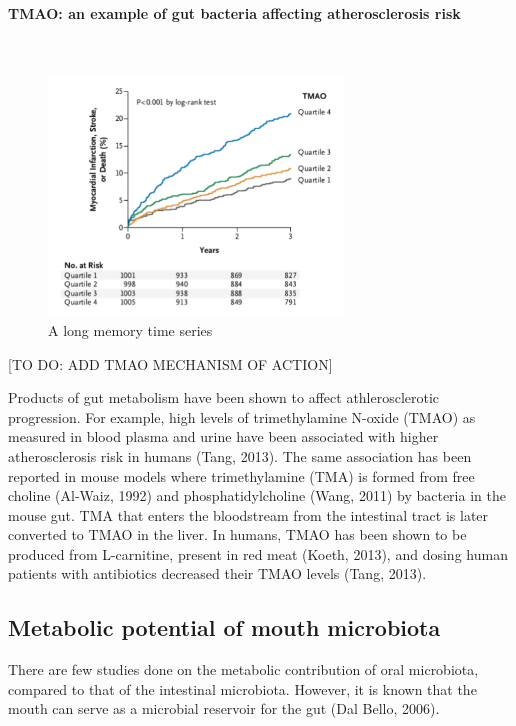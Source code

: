 \paragraph{TMAO: an example of gut bacteria affecting atherosclerosis risk}\mbox{}\\

\begin{figure}[h]
\begin{center}
\includegraphics[width=0.7\textwidth]{kaplan_meier.png}
\caption{A long memory time series\label{ts1}}
\end{center}
\end{figure}

[TO DO: ADD TMAO MECHANISM OF ACTION]

Products of gut metabolism have been shown to affect athlerosclerotic progression. For example, high levels of trimethylamine N-oxide (TMAO) as measured in blood plasma and urine have been associated with higher atherosclerosis risk in humans (Tang, 2013). The same association has been reported in mouse models where trimethylamine (TMA) is formed from free choline (Al-Waiz, 1992) and phosphatidylcholine (Wang, 2011) by bacteria in the mouse gut. TMA that enters the bloodstream from the intestinal tract is later converted to TMAO in the liver. In humans, TMAO has been shown to be produced from L-carnitine, present in red meat (Koeth, 2013), and dosing human patients with antibiotics decreased their TMAO levels (Tang, 2013).

\FloatBarrier

\subsection{Metabolic potential of mouth microbiota}
There are few studies done on the metabolic contribution of oral microbiota, compared to that of the intestinal microbiota. However, it is known that the mouth can serve as a microbial reservoir for the gut (Dal Bello, 2006).


